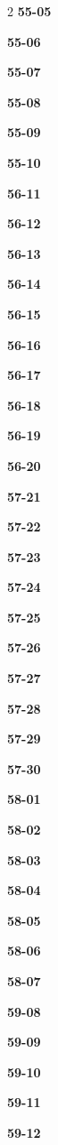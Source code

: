 \documentclass[10pt,a4paper]{article}
\begin{document}
\begin{multicols}{2}
\noindent\textbf{55-05}\ \par
\noindent\textbf{55-06}\ \par
\noindent\textbf{55-07}\ \par
\noindent\textbf{55-08}\ \par
\noindent\textbf{55-09}\ \par
\noindent\textbf{55-10}\ \par
\noindent\textbf{56-11}\ \par
\noindent\textbf{56-12}\ \par
\noindent\textbf{56-13}\ \par
\noindent\textbf{56-14}\ \par
\noindent\textbf{56-15}\ \par
\noindent\textbf{56-16}\ \par
\noindent\textbf{56-17}\ \par
\noindent\textbf{56-18}\ \par
\noindent\textbf{56-19}\ \par
\noindent\textbf{56-20}\ \par
\noindent\textbf{57-21}\ \par
\noindent\textbf{57-22}\ \par
\noindent\textbf{57-23}\ \par
\noindent\textbf{57-24}\ \par
\noindent\textbf{57-25}\ \par
\noindent\textbf{57-26}\ \par
\noindent\textbf{57-27}\ \par
\noindent\textbf{57-28}\ \par
\noindent\textbf{57-29}\ \par
\noindent\textbf{57-30}\ \par
\noindent\textbf{58-01}\ \par
\noindent\textbf{58-02}\ \par
\noindent\textbf{58-03}\ \par
\noindent\textbf{58-04}\ \par
\noindent\textbf{58-05}\ \par
\noindent\textbf{58-06}\ \par
\noindent\textbf{58-07}\ \par
\noindent\textbf{59-08}\ \par
\noindent\textbf{59-09}\ \par
\noindent\textbf{59-10}\ \par
\noindent\textbf{59-11}\ \par
\noindent\textbf{59-12}\ \par

\end{multicols}
\end{document}
